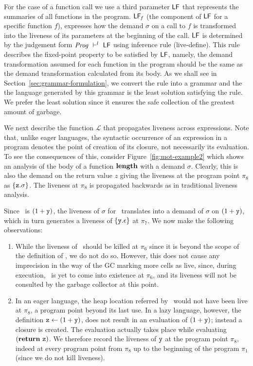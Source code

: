 \documentclass[9pt]{sigplanconf}
\begin{document}
For the  case of a  function call we  use a third  parameter $\mathsf{LF}$
that  represents  the  summaries  of all  functions  in  the  program.
$\mathsf{LF}_{\mathit  f}$  (the component  of  $\mathsf{LF}$  for a  specific
function $f$), expresses  how the demand $\sigma$ on a  call to $f$ is
transformed into  the liveness of  its parameters at the  beginning of
the   call.    $\mathsf{LF}$  is   determined   by   the  judgement   form
$\mathit{Prog} \ \vdash^l\  \mathsf{LF}$ using inference rule ({\sc live-define}).
This  rule  describes the  fixed-point  property  to be  satisfied  by
$\mathsf{LF}$, namely, the demand transformation assumed for each function
in  the  program should  be  the  same  as the  demand  transformation
calculated    from    its    body.      As    we    shall    see    in
Section~\ref{sec:grammar-formulation},  we  convert  the rule  into  a
grammar and  the the language generated  by this grammar is  the least
solution satisfying  the rule. We  prefer the least solution  since it
ensures the safe collection of the greatest amount of garbage.

We next  describe the function $\mathcal{L}$  that propagates liveness
across expressions.  Note that,  unlike eager languages, the syntactic
occurrence  of an expression  in a  program denotes  the point  of
creation of its closure, not necessarily its evaluation.
To see the  consequences of this, consider
Figure~\ref{fig:mot-example2} which shows an analysis  of the body of
a function $\mathbf{length}$ with a demand $\sigma$.  Clearly, this is also the
demand on the return value $z$ giving the liveness at the program point
$\pi_8$ as $\{\mbox{\tt z}.\sigma\}$.  The liveness at $\pi_8$ is propagated
backwards as in traditional liveness analysis.

Since   \pz\  is   $(1  +   \mbox{\tt y})$,  the   liveness  of   $\sigma$  for
\pz\ translates into a demand  of $\sigma$ on $(1+\mbox{\tt y})$, which in turn
generates a  liveness of $\{\mbox{\tt y}.\epsilon\}$ at  $\pi_7$.  We now make
the following observations:
\begin{enumerate}
\item While the liveness of \py\  should be killed at $\pi_6$ since it
  is  beyond the scope  of the  definition of  \py, we  do not  do so.
  However, this  does not cause any  imprecision in the way  of the GC
  marking more cells as live,  since, during execution, \py\ is yet to
  come  into  existence at  $\pi_6$,  and  its  liveness will  not  be
  consulted by the garbage collector at this point.
\item In an  eager language, the heap location referred  by \py\ would
  not have been live at $\pi_8$,  a program point beyond its last use.
  In  a  lazy  language,   however,  the  definition  $\mbox{\tt z}  \leftarrow
  (1+\mbox{\tt y})$, does not  result in an evaluation of  $(1+\mbox{\tt y})$; instead a
  closure  is  created.  The  evaluation  actually  takes place  while
  evaluating $(\mbox{$\mathbf{ return}$}~\mbox{\tt z})$.   We therefore  record the  liveness of
  $\mbox{\tt y}$ at  the program point  $\pi_8$, indeed at every  program point
  from $\pi_8$ up to the beginning of the program $\pi_1$ (since we do
  not kill liveness).
\end{enumerate}
\end{document}
